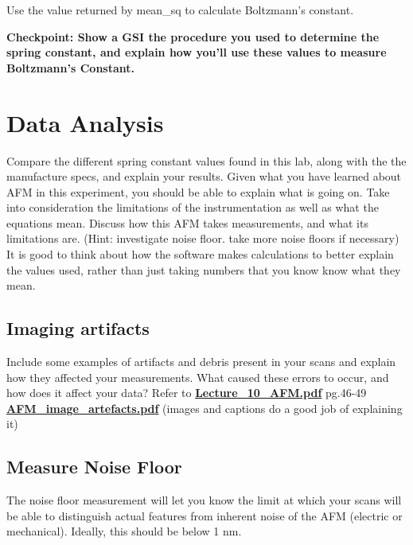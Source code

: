 \documentclass{../lab}
\begin{document}
Use the value returned by mean\_sq to calculate Boltzmann’s constant.

\textbf{Checkpoint: Show a GSI the procedure you used to determine the spring constant, and explain how you'll use these values to measure Boltzmann's Constant.}

\section{Data Analysis}
Compare the different spring constant values found in this lab, along with the the manufacture specs, and explain your results.  Given what you have learned about AFM in this experiment, you should be able to explain what is going on.
Take into consideration the limitations of the instrumentation as well as what the equations mean.  Discuss how this AFM takes measurements, and what its limitations are.   (Hint: investigate noise floor. take more noise floors if necessary)
It is good to think about how the software makes calculations to better explain the values used, rather than just taking numbers that you know know what they mean.


\subsection{Imaging artifacts}
Include some examples of  artifacts and debris present in your scans and explain how they affected your measurements.  What caused these errors to occur, and how does it affect your data?
Refer to \href{http://experimentationlab.berkeley.edu/sites/default/files/AFMImages/Lecture\_10\_AFM.pdf}{\textbf{Lecture\_10\_AFM.pdf}}  pg.46-49
         \href{http://experimentationlab.berkeley.edu/sites/default/files/AFMImages/AFM\_image\_artefacts.pdf}{\textbf{AFM\_image\_artefacts.pdf}} (images and captions do a good job of explaining it)

\subsection{Measure Noise Floor}
The noise floor measurement will let you know the limit at which your scans will be able to distinguish actual features from inherent noise of the AFM (electric or mechanical).  Ideally, this should be below 1 nm.
\end{document}
